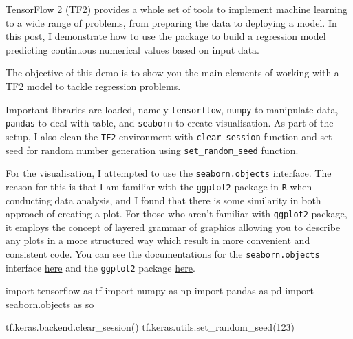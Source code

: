 \documentclass[
  letterpaper,
  DIV=11,
  numbers=noendperiod]{scrreprt}
\newenvironment{Shaded}{\begin{snugshade}}{\end{snugshade}}
\newcommand{\DecValTok}[1]{\textcolor[rgb]{0.68,0.00,0.00}{#1}}
\newcommand{\ImportTok}[1]{\textcolor[rgb]{0.00,0.46,0.62}{#1}}
\newcommand{\NormalTok}[1]{\textcolor[rgb]{0.00,0.23,0.31}{#1}}
\begin{document}
TensorFlow 2 (TF2) provides a whole set of tools to implement machine
learning to a wide range of problems, from preparing the data to
deploying a model. In this post, I demonstrate how to use the package to
build a regression model predicting continuous numerical values based on
input data.

The objective of this demo is to show you the main elements of working
with a TF2 model to tackle regression problems.

Important libraries are loaded, namely \texttt{tensorflow},
\texttt{numpy} to manipulate data, \texttt{pandas} to deal with table,
and \texttt{seaborn} to create visualisation. As part of the setup, I
also clean the \texttt{TF2} environment with \texttt{clear\_session}
function and set seed for random number generation using
\texttt{set\_random\_seed} function.

For the visualisation, I attempted to use the \texttt{seaborn.objects}
interface. The reason for this is that I am familiar with the
\texttt{ggplot2} package in \texttt{R} when conducting data analysis,
and I found that there is some similarity in both approach of creating a
plot. For those who aren't familiar with \texttt{ggplot2} package, it
employs the concept of
\href{https://vita.had.co.nz/papers/layered-grammar.html}{layered
grammar of graphics} allowing you to describe any plots in a more
structured way which result in more convenient and consistent code. You
can see the documentations for the \texttt{seaborn.objects} interface
\href{https://seaborn.pydata.org/tutorial/objects_interface}{here} and
the \texttt{ggplot2} package
\href{https://ggplot2.tidyverse.org/}{here}.

\begin{Shaded}
\begin{Highlighting}[]
\ImportTok{import}\NormalTok{ tensorflow }\ImportTok{as}\NormalTok{ tf}
\ImportTok{import}\NormalTok{ numpy }\ImportTok{as}\NormalTok{ np}
\ImportTok{import}\NormalTok{ pandas }\ImportTok{as}\NormalTok{ pd}
\ImportTok{import}\NormalTok{ seaborn.objects }\ImportTok{as}\NormalTok{ so}
\end{Highlighting}
\end{Shaded}

\begin{Shaded}
\begin{Highlighting}[]
\NormalTok{tf.keras.backend.clear\_session()}
\NormalTok{tf.keras.utils.set\_random\_seed(}\DecValTok{123}\NormalTok{)}
\end{Highlighting}
\end{Shaded}
\end{document}
